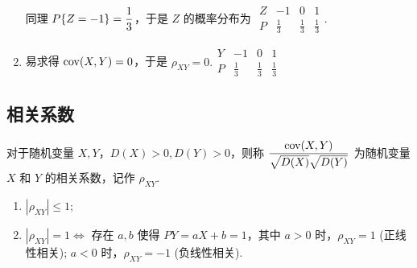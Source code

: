 \begin{solution}
\begin{minipage}{0.68\linewidth}
\begin{enumerate}[label=(\arabic{*})]
            同理 $P\qty{Z=-1}=\dfrac{1}{3}$，于是 $Z$ 的概率分布为 $\begin{array}{c|ccc}
                Z & -1          & 0           & 1           \\\hline
                P & \frac{1}{3} & \frac{1}{3} & \frac{1}{3}
            \end{array}.$
            \item 易求得 $\mathrm{cov}(X,Y)=0$，于是 $\rho_{XY}=0.\begin{array}{c|ccc}
                Y & -1          & 0           & 1           \\\hline
                P & \frac{1}{3} & \frac{1}{3} & \frac{1}{3}
            \end{array}$
        \end{enumerate}
    \end{minipage}
\end{solution}

\subsection{相关系数}

\begin{definition}[相关系数]
    对于随机变量 $X,Y$，$D(X)>0,D(Y)>0$，则称 $\dfrac{\mathrm{cov}(X,Y)}{\sqrt{D(X)}\sqrt{D(Y)}}$ 为随机变量 $X$ 和 $Y$ 的相关系数，记作 $\rho_{XY}$.
\end{definition}

\begin{theorem}[相关系数的性质]
    \begin{enumerate}[label=(\arabic{*})]
        \item $|\rho_{XY}|\leqslant 1$;
        \item $|\rho_{XY}|=1\Leftrightarrow $ 存在 $a,b$ 使得 $P{Y=aX+b}=1$，其中 $a>0$ 时，$\rho_{XY}=1$ (正线性相关); $a<0$ 时，$\rho_{XY}=-1$ (负线性相关).
    \end{enumerate}
\end{theorem}

